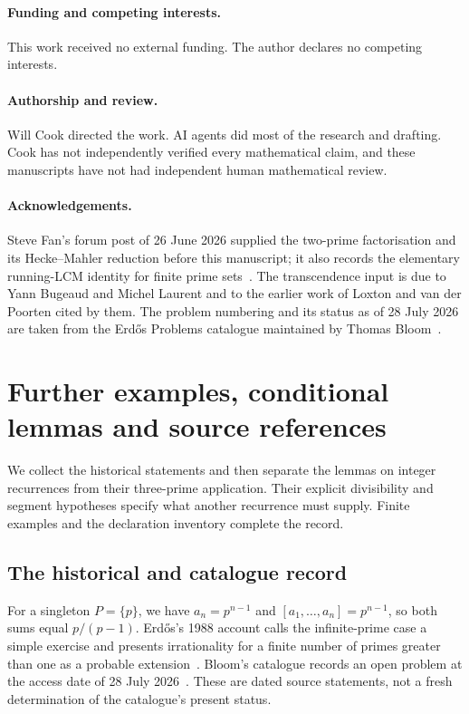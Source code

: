 \paragraph{Funding and competing interests.} This work received no external
funding.  The author declares no competing interests.

\paragraph{Authorship and review.} Will Cook directed the work.  AI agents
did most of the research and drafting.  Cook has not independently
verified every mathematical claim, and these manuscripts have not had
independent human mathematical review.

\paragraph{Acknowledgements.}  Steve Fan's forum post of 26 June 2026 supplied the
two-prime factorisation and its Hecke--Mahler reduction before this
manuscript; it also records the elementary running-LCM identity for finite
prime sets~\cite{fan2026comment}.  The
transcendence input is due to Yann Bugeaud and Michel Laurent and to the
earlier work of Loxton and van der Poorten cited by them.  The
problem numbering and its status as of 28 July 2026 are taken from the
Erd\H{o}s Problems catalogue maintained by Thomas Bloom~\cite{erdosproblems}.
\section{Further examples, conditional lemmas and source references}
\label{long269:long:extended}

We collect the historical statements and then separate the lemmas on integer recurrences
from their three-prime application. Their explicit divisibility and
segment hypotheses specify what another recurrence must supply. Finite
examples and the declaration inventory complete the record.

\subsection{The historical and catalogue record}\label{long269:long:history}

For a singleton $P=\{p\}$, we have $a_n=p^{n-1}$ and
$[a_1,\ldots,a_n]=p^{n-1}$, so both sums equal $p/(p-1)$.
Erd\H{o}s's 1988 account calls the infinite-prime case a simple exercise
and presents irrationality for a finite number of primes greater than one
as a probable extension~\cite[p.~106]{erdos1988}.
Bloom's catalogue records an open problem at the access date of
28 July 2026~\cite{erdosproblems}. These are dated source statements,
not a fresh determination of the catalogue's present status.


